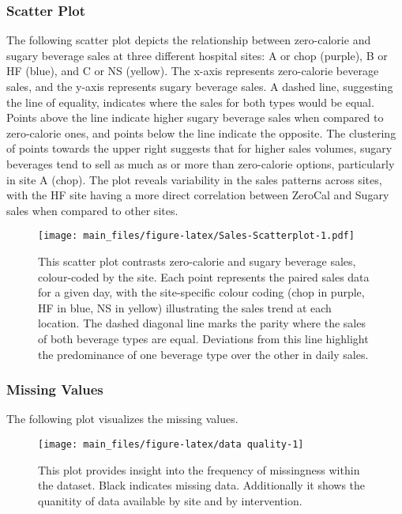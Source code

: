 \documentclass[
]{article}
\begin{document}
\hypertarget{scatter-plot}{%
\subsubsection{Scatter Plot}\label{scatter-plot}}

The following scatter plot depicts the relationship between zero-calorie
and sugary beverage sales at three different hospital sites: A or chop
(purple), B or HF (blue), and C or NS (yellow). The x-axis represents
zero-calorie beverage sales, and the y-axis represents sugary beverage
sales. A dashed line, suggesting the line of equality, indicates where
the sales for both types would be equal. Points above the line indicate
higher sugary beverage sales when compared to zero-calorie ones, and
points below the line indicate the opposite. The clustering of points
towards the upper right suggests that for higher sales volumes, sugary
beverages tend to sell as much as or more than zero-calorie options,
particularly in site A (chop). The plot reveals variability in the sales
patterns across sites, with the HF site having a more direct correlation
between ZeroCal and Sugary sales when compared to other sites.

\begin{figure}
\centering
\texttt{[image: main\_files/figure-latex/Sales-Scatterplot-1.pdf]}
\caption{This scatter plot contrasts zero-calorie and sugary beverage
sales, colour-coded by the site. Each point represents the paired sales
data for a given day, with the site-specific colour coding (chop in
purple, HF in blue, NS in yellow) illustrating the sales trend at each
location. The dashed diagonal line marks the parity where the sales of
both beverage types are equal. Deviations from this line highlight the
predominance of one beverage type over the other in daily sales.}
\end{figure}

\hypertarget{missing-values}{%
\subsubsection{Missing Values}\label{missing-values}}

The following plot visualizes the missing values.

\begin{figure}

{\centering \texttt{[image: main\_files/figure-latex/data quality-1]} 

}

\caption{This plot provides insight into the frequency of missingness within the dataset. Black indicates missing data. Additionally it shows the quanitity of data available by site and by intervention.}\label{fig:data quality}
\end{figure}
\end{document}

